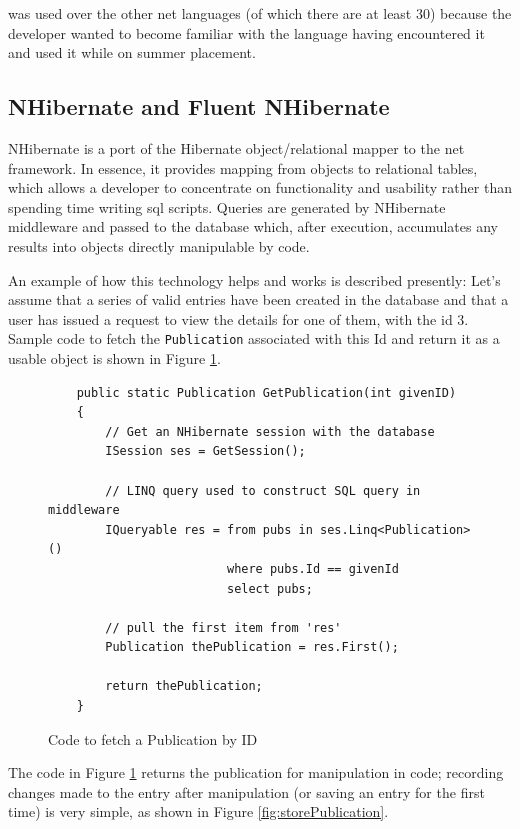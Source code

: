 \cs{} was used over the other \gls{net} languages (of which there are at least 30) \cite{csUnleashed} because the developer wanted to become familiar with the language having encountered it and used it while on summer placement.

\subsection{NHibernate and Fluent NHibernate}
\label{nhibernate}
NHibernate is a port of the Hibernate object/relational mapper to the \gls{net} framework. In essence, it provides mapping from objects to relational tables, which allows a developer to concentrate on functionality and usability rather than spending time writing \gls{sql} scripts. Queries are generated by NHibernate middleware and passed to the database which, after execution, accumulates any results into objects directly manipulable by \cs{} code. 

An example of how this technology helps and works is described presently: Let's assume that a series of valid entries have been created in the database and that a user has issued a request to view the details for one of them, with the \gls{id} 3.  Sample code to fetch the \texttt{Publication} associated with this Id and return it as a usable object is shown in Figure \ref{fig:fetchPubCode}.

\begin{figure}
	\begin{center}
			\lstset{language=CSharp} 
			\begin{lstlisting}
	public static Publication GetPublication(int givenID)
	{
	    // Get an NHibernate session with the database
	    ISession ses = GetSession(); 
	
	   	// LINQ query used to construct SQL query in middleware
	    IQueryable res = from pubs in ses.Linq<Publication>()
	                     where pubs.Id == givenId
	                     select pubs;
	                        
	    // pull the first item from 'res' 
	    Publication thePublication = res.First();
	    
	    return thePublication;
	}
			\end{lstlisting}
		\caption{Code to fetch a Publication by ID}
		\label{fig:fetchPubCode}
	\end{center}
\end{figure}

The code in Figure \ref{fig:fetchPubCode} returns the publication for manipulation in code; recording changes made to the entry after manipulation (or saving an entry for the first time) is very simple, as shown in Figure \ref{fig:storePublication}.

